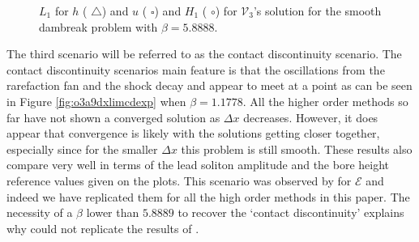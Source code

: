 \documentclass[SingleSpace,12pt,Proceedings]{Serre_ASCE}
\begin{document}
\begin{figure}
\centering
{}
\caption{$L_1$ for $h$ ({\color{red} $\triangle$}) and $u$ ({\color{blue} $\square$}) and $H_1$ ({\color{blue} $\circ$}) for $\mathcal{V}_3$'s solution for the smooth dambreak problem with $\beta = 5.8888$.}
\label{fig:o3a2dxlimmeasure}
\end{figure}

The third scenario will be referred to as the contact discontinuity \cite{El-etal-2006} scenario. The contact discontinuity scenarios main feature is that the oscillations from the rarefaction fan and the shock decay and appear to meet at a point as can be seen in Figure \ref{fig:o3a9dxlimcdexp} when $\beta = 1.1778$. All the higher order methods so far have not shown a converged solution as $\Delta x$ decreases. However, it does appear that convergence is likely with the solutions getting closer together, especially since for the smaller $\Delta x$ this problem is still smooth. These results also compare very well in terms of the lead soliton amplitude and the bore height reference values given on the plots. This scenario was observed by  for $\mathcal{E}$ and indeed we have replicated them for all the high order methods in this paper. The necessity of a $\beta$ lower than $5.8889$ to recover the `contact discontinuity' explains why \cite{Mitsotakis-etal-2014} could not replicate the results of \cite{El-etal-2006}. 
\end{document}
